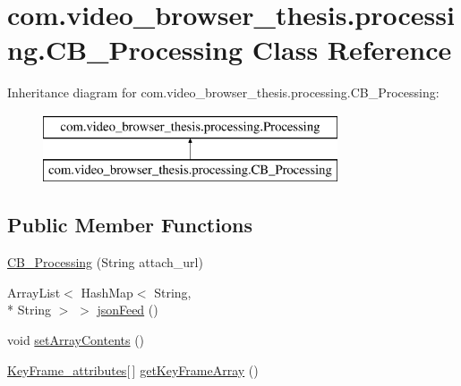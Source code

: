 \hypertarget{classcom_1_1video__browser__thesis_1_1processing_1_1_c_b___processing}{\section{com.\-video\-\_\-browser\-\_\-thesis.\-processing.\-C\-B\-\_\-\-Processing Class Reference}
\label{classcom_1_1video__browser__thesis_1_1processing_1_1_c_b___processing}
}
Inheritance diagram for com.\-video\-\_\-browser\-\_\-thesis.\-processing.\-C\-B\-\_\-\-Processing\-:\begin{figure}[H]
\begin{center}
\leavevmode
\includegraphics[height=2.000000cm]{classcom_1_1video__browser__thesis_1_1processing_1_1_c_b___processing}
\end{center}
\end{figure}
\subsection*{Public Member Functions}
\begin{DoxyCompactItemize}
\item 
\hyperlink{classcom_1_1video__browser__thesis_1_1processing_1_1_c_b___processing_a87e4464dda5cb3f036bd436f1f46dee8}{C\-B\-\_\-\-Processing} (String attach\-\_\-url)
\item 
Array\-List$<$ Hash\-Map$<$ String, \\*
String $>$ $>$ \hyperlink{classcom_1_1video__browser__thesis_1_1processing_1_1_c_b___processing_a560a649794c8a210bcd4ad42a728701e}{json\-Feed} ()
\item 
void \hyperlink{classcom_1_1video__browser__thesis_1_1processing_1_1_c_b___processing_ae269a53ade47993d98abc4e0fc1d2fac}{set\-Array\-Contents} ()
\item 
\hyperlink{classcom_1_1video__browser__thesis_1_1elements_1_1_key_frame__attributes}{Key\-Frame\-\_\-attributes}\mbox{[}$\,$\mbox{]} \hyperlink{classcom_1_1video__browser__thesis_1_1processing_1_1_c_b___processing_aa9dbb5244312dc8e23f0f825cc38ba7c}{get\-Key\-Frame\-Array} ()
\end{DoxyCompactItemize}


